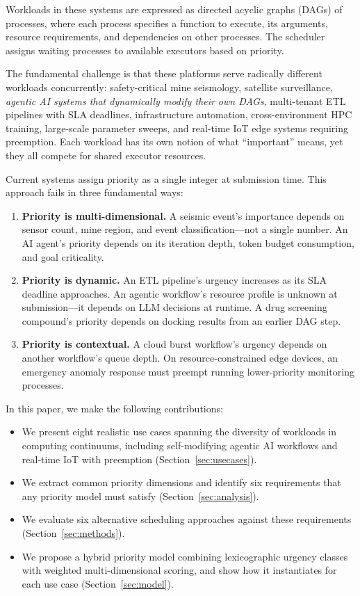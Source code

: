 \documentclass[conference]{IEEEtran}
\begin{document}
Workloads in these systems are expressed as directed acyclic graphs (DAGs) of processes, where each process specifies a function to execute, its arguments, resource requirements, and dependencies on other processes. The scheduler assigns waiting processes to available executors based on priority.

The fundamental challenge is that these platforms serve radically different workloads concurrently: safety-critical mine seismology, satellite surveillance, \emph{agentic AI systems that dynamically modify their own DAGs}, multi-tenant ETL pipelines with SLA deadlines, infrastructure automation, cross-environment HPC training, large-scale parameter sweeps, and real-time IoT edge systems requiring preemption. Each workload has its own notion of what ``important'' means, yet they all compete for shared executor resources.

Current systems assign priority as a single integer at submission time. This approach fails in three fundamental ways:

\begin{enumerate}
    \item \textbf{Priority is multi-dimensional.} A seismic event's importance depends on sensor count, mine region, and event classification---not a single number. An AI agent's priority depends on its iteration depth, token budget consumption, and goal criticality.
    \item \textbf{Priority is dynamic.} An ETL pipeline's urgency increases as its SLA deadline approaches. An agentic workflow's resource profile is unknown at submission---it depends on LLM decisions at runtime. A drug screening compound's priority depends on docking results from an earlier DAG step.
    \item \textbf{Priority is contextual.} A cloud burst workflow's urgency depends on another workflow's queue depth. On resource-constrained edge devices, an emergency anomaly response must preempt running lower-priority monitoring processes.
\end{enumerate}

In this paper, we make the following contributions:

\begin{itemize}
    \item We present eight realistic use cases spanning the diversity of workloads in computing continuums, including self-modifying agentic AI workflows and real-time IoT with preemption (Section~\ref{sec:usecases}).
    \item We extract common priority dimensions and identify six requirements that any priority model must satisfy (Section~\ref{sec:analysis}).
    \item We evaluate six alternative scheduling approaches against these requirements (Section~\ref{sec:methods}).
    \item We propose a hybrid priority model combining lexicographic urgency classes with weighted multi-dimensional scoring, and show how it instantiates for each use case (Section~\ref{sec:model}).
\end{itemize}
\end{document}
